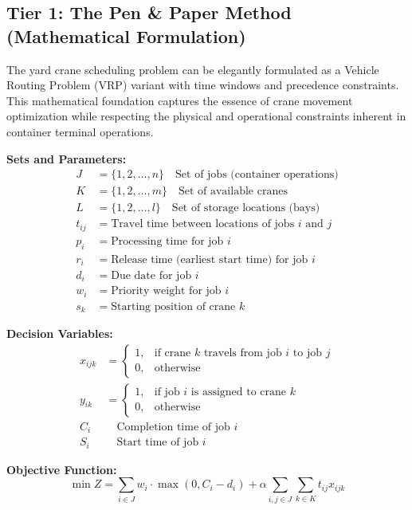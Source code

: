 \documentclass{article}
\begin{document}
\subsection{Tier 1: The Pen \& Paper Method (Mathematical Formulation)}

The yard crane scheduling problem can be elegantly formulated as a Vehicle Routing Problem (VRP) variant with time windows and precedence constraints. This mathematical foundation captures the essence of crane movement optimization while respecting the physical and operational constraints inherent in container terminal operations.

\textbf{Sets and Parameters:}
\begin{align}
J &= \{1, 2, \ldots, n\} \quad \text{Set of jobs (container operations)} \\
K &= \{1, 2, \ldots, m\} \quad \text{Set of available cranes} \\
L &= \{1, 2, \ldots, l\} \quad \text{Set of storage locations (bays)} \\
t_{ij} &= \text{Travel time between locations of jobs } i \text{ and } j \\
p_i &= \text{Processing time for job } i \\
r_i &= \text{Release time (earliest start time) for job } i \\
d_i &= \text{Due date for job } i \\
w_i &= \text{Priority weight for job } i \\
s_k &= \text{Starting position of crane } k
\end{align}

\textbf{Decision Variables:}
\begin{align}
x_{ijk} &= \begin{cases} 
1, & \text{if crane } k \text{ travels from job } i \text{ to job } j \\
0, & \text{otherwise}
\end{cases} \\
y_{ik} &= \begin{cases}
1, & \text{if job } i \text{ is assigned to crane } k \\
0, & \text{otherwise}
\end{cases} \\
C_i &\quad \text{Completion time of job } i \\
S_i &\quad \text{Start time of job } i
\end{align}

\textbf{Objective Function:}
\begin{equation}
\min Z = \sum_{i \in J} w_i \cdot \max(0, C_i - d_i) + \alpha \sum_{i,j \in J} \sum_{k \in K} t_{ij} x_{ijk}
\end{equation}
\end{document}
